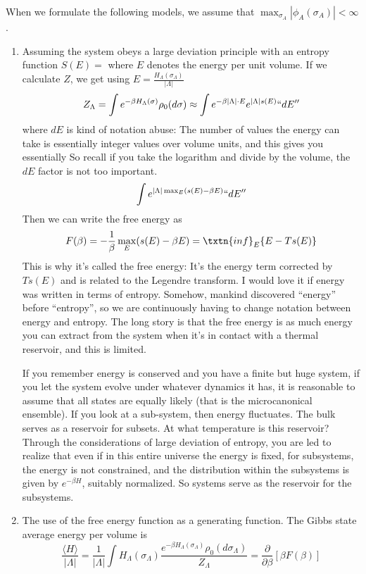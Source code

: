 When we formulate the following models, we assume that $\max_{\sigma_A} |\phi_A(\sigma_A)| < \infty$. 

\begin{enumerate}
 
\item Assuming the system obeys a large deviation principle with an entropy function $S(E) = $ where $E$ denotes the energy per unit volume. If we calculate $Z$, we get using $E = \frac{H_{\Lambda}(\sigma_{\Lambda})}{|\Lambda|}$
\[
Z_{\Lambda} = \int e^{-\beta H_{\Lambda}(\sigma)}\rho_0(d\sigma) \approx \int e^{-\beta|\Lambda|\cdot E} e^{|\Lambda|s(E)} ``dE''
\]
where $dE$ is kind of notation abuse: The number of values the energy can take is essentially integer values over volume units, and this gives you essentially So recall if you take the logarithm and divide by the volume, the $dE$ factor is not too important.  
\[
\int e^{|\Lambda|\max_E(s(E) - \beta E)}``dE''
\]
Then we can write the free energy as 
\[
F(\beta) = - \frac{1}{\beta} \max_E(s(E) - \beta E) = \txtn{inf}_E\{E - Ts(E)\}
\]
This is why it's called the free energy: It's the energy term corrected by $Ts(E)$ and is related to the Legendre transform. I would love it if energy was written in terms of entropy. Somehow, mankind discovered ``energy'' before ``entropy'', so we are continuously having to change notation between energy and entropy. The long story is that the free energy is as much energy you can extract from the system when it's in contact with a thermal reservoir, and this is limited. 

If you remember energy is conserved and you have a finite but huge system, if you let the system evolve under whatever dynamics it has, it is reasonable to assume that all states are equally likely (that is the microcanonical ensemble). If you look at a sub-system, then energy fluctuates. The bulk serves as a reservoir for subsets. At what temperature is this reservoir? Through the considerations of large deviation of entropy, you are led to realize that even if in this entire universe the energy is fixed, for subsystems, the energy is not constrained, and the distribution within the subsystems is given by $e^{-\beta H}$, suitably normalized. So systems serve as the reservoir for the subsystems. 

\item The use of the free energy function as a generating function. The Gibbs state average energy per volume is 
\[
\frac{\langle H \rangle}{|\Lambda|} = \frac{1}{|\Lambda|} \int H_{\Lambda}(\sigma_{\Lambda}) \frac{e^{-\beta H_{\Lambda}(\sigma_{\Lambda})} \rho_0(d\sigma_{\Lambda})}{Z_{\Lambda}} = \frac{\partial}{\partial\beta}\left[\beta F(\beta)\right]
\]


\end{enumerate}
